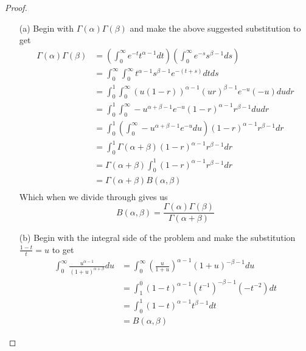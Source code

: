 \documentclass[10pt]{article}
\theoremstyle{plain}
\theoremstyle{remark}
\begin{document}
\begin{proof}
  \begin{enumerate}
  \item[(a)] Begin with $\Gamma\left(\alpha\right)\Gamma\left(\beta\right)$ and make the above suggested
    substitution to get
    \begin{align*}
      \Gamma\left(\alpha\right)\Gamma\left(\beta\right) &= \left(\int_0^\infty e^{-t}t^{\alpha-1}dt\right)\left(\int_0^\infty e^{-s}s^{\beta-1}ds\right)\\
               &=\int_0^\infty\int_0^\infty t^{\alpha-1}s^{\beta-1}e^{-\left(t+s\right)}dtds\\
               &=\int_0^1\int_0^\infty\left(u\left(1-r\right)\right)^{\alpha-1}\left(ur\right)^{\beta-1}e^{-u}\left(-u\right)dudr\\
               &=\int_0^1\int_0^\infty-u^{\alpha+\beta-1}e^{-u}\left(1-r\right)^{\alpha-1}r^{\beta-1}dudr\\
               &=\int_0^1\left(\int_0^\infty-u^{\alpha+\beta-1}e^{-u}du\right)\left(1-r\right)^{\alpha-1}r^{\beta-1}dr\\
               &=\int_0^1\Gamma\left(\alpha+\beta\right)\left(1-r\right)^{\alpha-1}r^{\beta-1}dr\\
               &=\Gamma\left(\alpha+\beta\right)\int_0^1\left(1-r\right)^{\alpha-1}r^{\beta-1}dr\\
               &=\Gamma\left(\alpha+\beta\right)B\left(\alpha,\beta\right)\\
    \end{align*}
    Which when we divide through gives us
    \[
      B\left(\alpha,\beta\right)=\frac{\Gamma\left(\alpha\right)\Gamma\left(\beta\right)}{\Gamma\left(\alpha+\beta\right)}
    \]
  \item[(b)] Begin with the integral side of the problem and make the
    substitution $\frac{1-t}{t}=u$ to get
    \begin{align*}
      \int_0^\infty\frac{u^{\alpha-1}}{\left(1+u\right)^{\alpha+\beta}}du &= \int_0^\infty \left(\frac{u}{1+u}\right)^{\alpha-1}\left(1+u\right)^{-\beta-1}du\\
                                                  &=\int_1^0 \left(1-t\right)^{\alpha-1}\left(t^{-1}\right)^{-\beta-1}\left(-t^{-2}\right)dt\\
                                                  &=\int_0^1 \left(1-t\right)^{\alpha-1}t^{\beta-1}dt\\
                                                  &=B\left(\alpha,\beta\right)
    \end{align*}
  \end{enumerate}
\end{proof}
\end{document}

